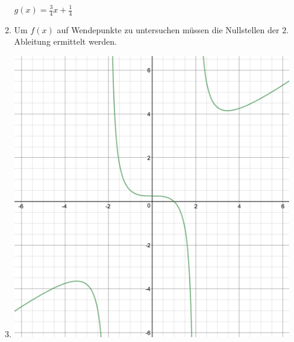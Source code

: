 \documentclass[main.tex]{subfiles}
\begin{document}
\begin{enumerate}
\begin{enumerate}
		            \( g(x) = \frac{3}{4}x + \frac{1}{4} \)
		      \item Um \( f(x) \) auf Wendepunkte zu untersuchen müssen die Nullstellen der \( 2. \) Ableitung ermittelt
		            werden.
			\item \begin{center}
			            \includegraphics[scale=0.25]{analysisGraph}
		            \end{center}
	      \end{enumerate}
\end{enumerate}
\end{document}
